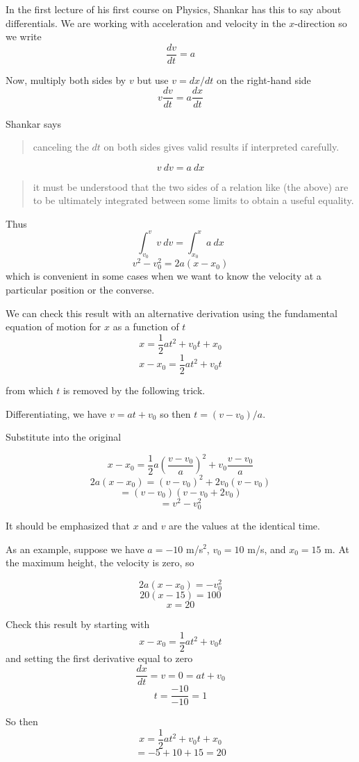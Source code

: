 \documentclass[11pt, oneside]{article}
\begin{document}
In the first lecture of his first course on Physics, Shankar has this to say about differentials.  We are working with acceleration and velocity in the $x$-direction so we write
\[ \frac{dv}{dt} = a \]

Now, multiply both sides by $v$ but use $v = dx/dt$ on the right-hand side
\[ v \frac{dv}{dt} = a \frac{dx}{dt} \]

Shankar says

\begin{quote}
canceling the $dt$ on both sides gives valid results if interpreted carefully.
\end{quote}

\[ v \ dv = a \ dx \]

\begin{quote}
it must be understood that the two sides of a relation like (the above) are to be ultimately integrated between some limits to obtain a useful equality.
\end{quote}

Thus
\[ \int_{v_0}^v v \ dv = \int_{x_0}^x a \ dx \]
\[ v^2 - v_0^2 = 2a(x - x_0) \]
which is convenient in some cases when we want to know the velocity at a particular position or the converse.

We can check this result with an alternative derivation using the fundamental equation of motion for $x$ as a function of $t$
\[ x = \frac{1}{2} at^2 + v_0 t + x_0 \]
\[ x - x_0 = \frac{1}{2} at^2 + v_0 t \]

from which $t$ is removed by the following trick.  

Differentiating, we have $v = at + v_0$ so then $t = (v - v_0)/a$.

Substitute into the original

\[ x - x_0 = \frac{1}{2} a(\frac{v-v_0}{a})^2 + v_0 \frac{v-v_0}{a} \]
\[ 2a(x - x_0) = (v-v_0)^2 +  2v_0(v-v_0) \]
\[ = (v - v_0)(v - v_0 + 2v_0) \]
\[ = v^2 -v_0^2 \]

It should be emphasized that $x$ and $v$ are the values at the identical time.

As an example, suppose we have $a = -10$ m/s$^2$, $v_0 = 10$ m/s, and $x_0 = 15$ m.  At the maximum height, the velocity is zero, so

\[ 2a(x - x_0) = -v_0^2 \]
\[ 20(x - 15) = 100 \]
\[ x = 20 \]

Check this result by starting with
\[ x - x_0 = \frac{1}{2} at^2 + v_0 t \]
and setting the first derivative equal to zero
\[ \frac{dx}{dt} = v = 0 = at + v_0 \]
\[ t = \frac{-10}{-10} = 1 \]

So then
\[ x = \frac{1}{2} at^2 + v_0 t + x_0 \]
\[ = -5 + 10 + 15 = 20 \]
\end{document}
